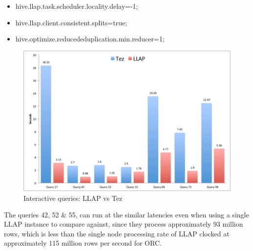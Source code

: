 \begin{itemize}
\item hive.llap.task.scheduler.locality.delay=-1;
\item hive.llap.client.consistent.splits=true;
\item hive.optimize.reducededuplication.min.reducer=1;
\end{itemize}

\begin{figure}[bthp]
\centering
\includegraphics[width=0.8\columnwidth]{figures/tpc-ds.pdf}
\caption{Interactive queries: LLAP vs Tez}
\label{fig:llap_v_tez}
\end{figure} 

The queries 42, 52 \& 55, can run at the similar latencies even when using a single LLAP instance to compare against, since they process
approximately 93 million rows, which is less than the single node processing rate of LLAP clocked at approximately 115 million rows per second  
for ORC.
